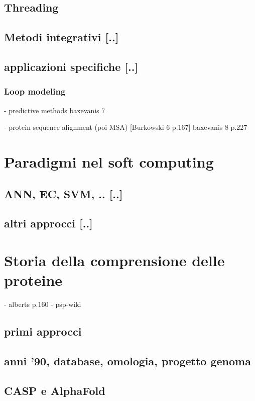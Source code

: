\subsection{Threading}
\subsection{Metodi integrativi [..]}
\subsection{applicazioni specifiche [..]}
\subsubsection{Loop modeling}

- predictive methods
baxevanis 7

- protein sequence alignment (poi MSA)
[Burkowski 6 p.167]
baxevanis 8 p.227

\section{Paradigmi nel soft computing}
\subsection{ANN, EC, SVM, .. [..]}
\subsection{altri approcci [..]}

\section{Storia della comprensione delle proteine}
- alberts p.160
- psp-wiki
\subsection{primi approcci}
\subsection{anni '90, database, omologia, progetto genoma}
\subsection{CASP e AlphaFold}

\clearpage